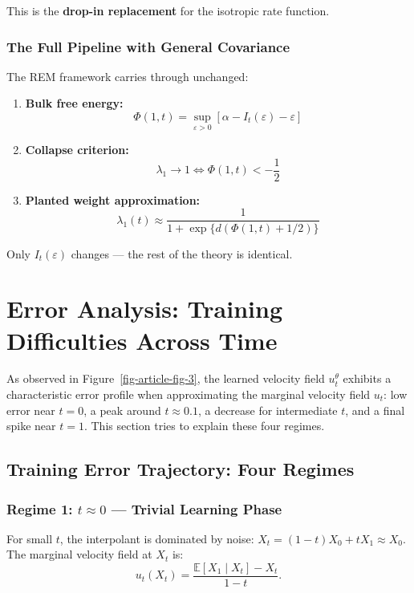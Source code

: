 \documentclass[11pt]{article}
\begin{document}
This is the \textbf{drop-in replacement} for the isotropic rate function.

\subsubsection{The Full Pipeline with General Covariance}
The REM framework carries through unchanged:
\begin{enumerate}
\item \textbf{Bulk free energy:}
\begin{equation}
\Phi(1,t) = \sup_{\varepsilon > 0}\left[\alpha - I_t(\varepsilon) - \varepsilon\right]
\end{equation}
\item \textbf{Collapse criterion:}
\begin{equation}
\lambda_1 \to 1 \iff \Phi(1,t) < -\frac{1}{2}
\end{equation}
\item \textbf{Planted weight approximation:}
\begin{equation}
\lambda_1(t) \approx \frac{1}{1 + \exp\{d(\Phi(1,t) + 1/2)\}}
\end{equation}
\end{enumerate}

\noindent Only $I_t(\varepsilon)$ changes --- the rest of the theory is identical.

\section{Error Analysis: Training Difficulties Across Time}\label{sec-error-analysis-training-difficulties-across-time}
As observed in Figure~\ref{fig-article-fig-3}, the learned velocity field $u^\theta_t$ exhibits a characteristic error profile when approximating the marginal velocity field $u_t$: low error near $t = 0$, a peak around $t \approx 0.1$, a decrease for intermediate $t$, and a final spike near $t = 1$. This section tries to explain these four regimes.

\subsection{Training Error Trajectory: Four Regimes}
\subsubsection{Regime 1: $t \approx 0$ --- Trivial Learning Phase}
For small $t$, the interpolant is dominated by noise: $X_t = (1-t)X_0 + tX_1 \approx X_0$. The marginal velocity field at $X_t$ is:
\begin{equation}
u_t(X_t) = \frac{\mathbb{E}[X_1 \mid X_t] - X_t}{1-t}.
\end{equation}
\end{document}
